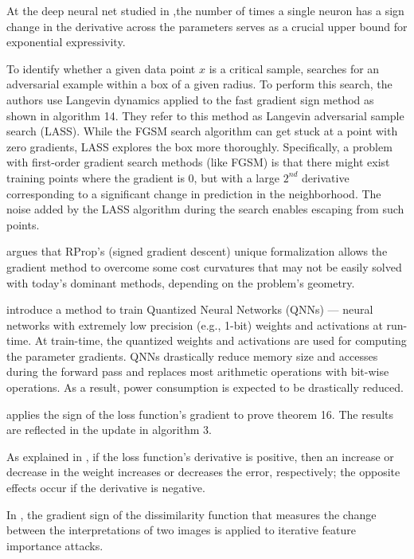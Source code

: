 \documentclass[11pt]{book}
\begin{document}
At the deep neural net studied in \cite{poole2016exponential},the
number of times a single neuron has a sign change in the derivative
across the parameters serves as a crucial upper bound for exponential
expressivity.

To identify whether a given data point $x$ is a critical sample,
\cite{arpit2017closer} searches for an adversarial example within
a box of a given radius. To perform this search, the authors use Langevin
dynamics applied to the fast gradient sign method as shown in algorithm
14. They refer to this method as Langevin adversarial sample search
(LASS). While the FGSM search algorithm can get stuck at a point with
zero gradients, LASS explores the box more thoroughly. Specifically,
a problem with first-order gradient search methods (like FGSM) is
that there might exist training points where the gradient is $0$,
but with a large $2^{nd}$ derivative corresponding to a significant
change in prediction in the neighborhood. The noise added by the LASS
algorithm during the search enables escaping from such points.

\cite{wang2017origin} argues that RProp's (signed gradient descent)
unique formalization allows the gradient method to overcome some cost
curvatures that may not be easily solved with today's dominant methods,
depending on the problem's geometry.

\cite{hubara2017quantized} introduce a method to train Quantized
Neural Networks (QNNs) --- neural networks with extremely low precision
(e.g., 1-bit) weights and activations at run-time. At train-time,
the quantized weights and activations are used for computing the parameter
gradients. QNNs drastically reduce memory size and accesses during
the forward pass and replaces most arithmetic operations with bit-wise
operations. As a result, power consumption is expected to be drastically
reduced.

\cite{fan2017unifying} applies the sign of the loss function's gradient
to prove theorem 16. The results are reflected in the update in algorithm
3.

As explained in \cite{gad2018practical}, if the loss function's derivative
is positive, then an increase or decrease in the weight increases
or decreases the error, respectively; the opposite effects occur if
the derivative is negative.

In \cite{ghorbani2019interpretation}, the gradient sign of the dissimilarity
function that measures the change between the interpretations of two
images is applied to iterative feature importance attacks.
\end{document}
